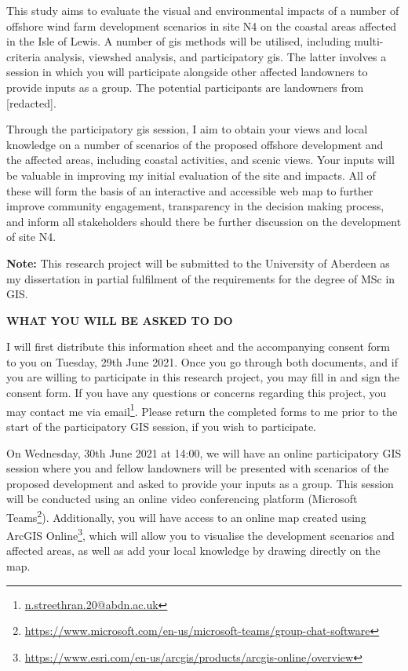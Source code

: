 {This study aims to evaluate the visual and environmental impacts of a number of offshore wind farm development scenarios in site N4 on the coastal areas affected in the Isle of Lewis. A number of \gls{gis} methods will be utilised, including multi-criteria analysis, viewshed analysis, and participatory \gls{gis}. The latter involves a session in which you will participate alongside other affected landowners to provide inputs as a group. The potential participants are landowners from [redacted].

Through the participatory \gls{gis} session, I aim to obtain your views and local knowledge on a number of scenarios of the proposed offshore development and the affected areas, including coastal activities, and scenic views. Your inputs will be valuable in improving my initial evaluation of the site and impacts. All of these will form the basis of an interactive and accessible web map to further improve community engagement, transparency in the decision making process, and inform all stakeholders should there be further discussion on the development of site N4.

\textbf{Note:} This research project will be submitted to the University of Aberdeen as my dissertation in partial fulfilment of the requirements for the degree of MSc in GIS.

\vspace{20pt}
\textbf{\MakeUppercase{What you will be asked to do}}

I will first distribute this information sheet and the accompanying consent form to you on Tuesday, 29th June 2021. Once you go through both documents, and if you are willing to participate in this research project, you may fill in and sign the consent form. If you have any questions or concerns regarding this project, you may contact me via email\footnote{\href{mailto:n.streethran.20@abdn.ac.uk}{n.streethran.20@abdn.ac.uk}\label{fn:email}}. Please return the completed forms to me prior to the start of the participatory GIS session, if you wish to participate.

On Wednesday, 30th June 2021 at 14:00, we will have an online participatory GIS session where you and fellow landowners will be presented with scenarios of the proposed development and asked to provide your inputs as a group. This session will be conducted using an online video conferencing platform (Microsoft Teams\footnote{\url{https://www.microsoft.com/en-us/microsoft-teams/group-chat-software}}). Additionally, you will have access to an online map created using ArcGIS Online\footnote{\url{https://www.esri.com/en-us/arcgis/products/arcgis-online/overview}}, which will allow you to visualise the development scenarios and affected areas, as well as add your local knowledge by drawing directly on the map.

}
